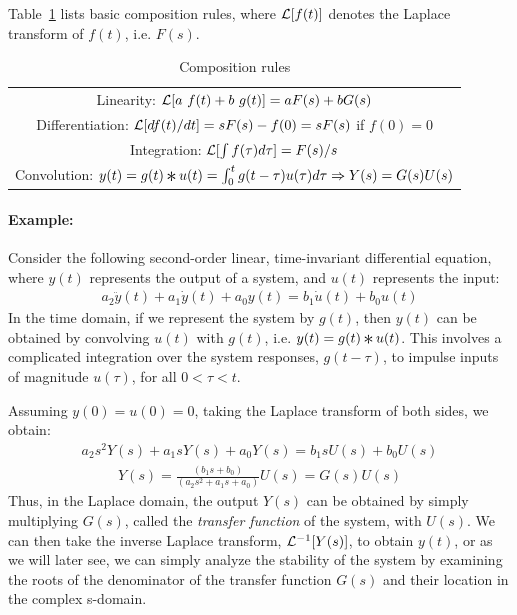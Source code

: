\documentclass{article}
\def\L{{\cal L}}
\newcommand{\Conv}{\mathop{\scalebox{1.5}{\raisebox{-0.2ex}{$\ast$}}}}%
\begin{document}
Table~\ref{tab:composition} lists basic composition rules, 
where $\L[f(t)]$ denotes the Laplace transform of $f(t)$, i.e. $F(s)$.
\begin{table}[htdp]
\caption{Composition rules}
\begin{center}
\begin{tabular}{|c|} \hline 
Linearity:	$\L[a\ f(t) + b\ g(t)] = a F(s) + b G(s)$ \\[2ex]
Differentiation: $\L[df(t)/dt] =  sF(s) - f(0) = sF(s)$ if $f(0) = 0$ \\[2ex]
Integration: $\L[\int f(\tau) d\tau] = F(s)/s$ \\[2ex]
Convolution: $y(t) = g(t) \Conv u(t) = \int_0^{t} g(t-\tau) u(\tau) d \tau \Rightarrow Y(s) = G(s) U(s)$ \\ [2ex] \hline
\end{tabular}
\end{center}
\label{default}
\label{tab:composition} 
\end{table}%

\paragraph{Example:}
Consider the following second-order linear, time-invariant differential equation, where $y(t)$ represents the output of a system, and $u(t)$ represents the input:
\begin{eqnarray*}
a_2 \ddot{y}(t) + a_1 \dot{y}(t) + a_0 y(t) = b_1 \dot{u}(t) + b_0 u(t)
\end{eqnarray*}
In the time domain, if we represent the system by $g(t)$,
then $y(t)$ can be obtained by convolving $u(t)$ with $g(t)$, i.e. $y(t)=g(t) \Conv u(t)$.
This involves a complicated integration over the system responses,
$g(t-\tau)$, to impulse inputs of magnitude $u(\tau)$, for all $0 < \tau < t$.

Assuming $y(0)=u(0)=0$, taking the Laplace transform of both sides, we obtain:
\begin{eqnarray*}
a_2 s^2 Y(s) + a_1 s Y(s) + a_0 Y(s) = b_1 s U(s) + b_0 U(s)
\end{eqnarray*}
\begin{eqnarray*}
Y(s) = \frac{(b_1 s  + b_0)}{(a_2 s^2 + a_1 s  + a_0)}  U(s) = G(s) U(s)
\end{eqnarray*}
Thus, in the Laplace domain, the output $Y(s)$ can be obtained by simply multiplying 
$G(s)$, called the {\em transfer function} of the system, with $U(s)$.
We can then take the inverse Laplace transform, $\L^{-1}[Y(s)]$, to obtain $y(t)$,
or as we will later see, we can simply analyze the stability of the system by examining 
the roots of the denominator of the transfer function $G(s)$ and their location in the complex s-domain.
\end{document}
